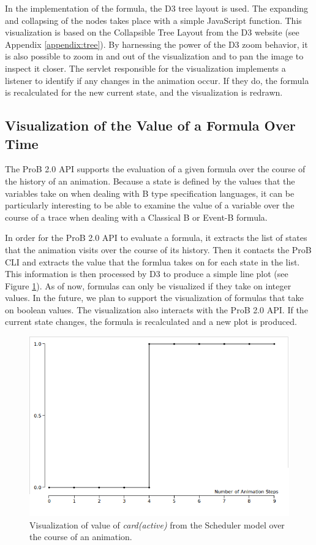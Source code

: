 In the implementation of the formula, the D3 tree layout is used. The expanding and collapsing of the nodes takes place with a simple JavaScript function. This visualization is based on the Collapsible Tree Layout from the D3 website (see Appendix \ref{appendix:tree}). By harnessing the power of the D3 zoom behavior, it is also possible to zoom in and out of the visualization and to pan the image to inspect it closer. The servlet responsible for the visualization implements a listener to identify if any changes in the animation occur. If they do, the formula is recalculated for the new current state, and the visualization is redrawn.

\subsection{Visualization of the Value of a Formula Over Time}

The ProB 2.0 API supports the evaluation of a given formula over the course of the history of an animation.
Because a state is defined by the values that the variables take on when dealing with B type specification languages, it can be particularly interesting to be able to examine the value of a variable over the course of a trace when dealing with a Classical B or Event-B formula. 

In order for the ProB 2.0 API to evaluate a formula, it extracts the list of states that the animation visits over the course of its history. Then it contacts the ProB CLI and extracts the value that the formlua takes on for each state in the list. This information is then processed by D3 to produce a simple line plot (see Figure \ref{timeVsValue}). As of now, formulas can only be visualized if they take on integer values. In the future, we plan to support the visualization of formulas that take on boolean values. The visualization also interacts with the ProB 2.0 API. If the current state changes, the formula is recalculated and a new plot is produced.

\begin{figure}[h!]
\centering
\includegraphics[width=14cm]{bilder/timeVsValue.png}
\caption{Visualization of value of \emph{card(active)} from the Scheduler model over the course of an animation.}
\label{timeVsValue}
\end{figure}


